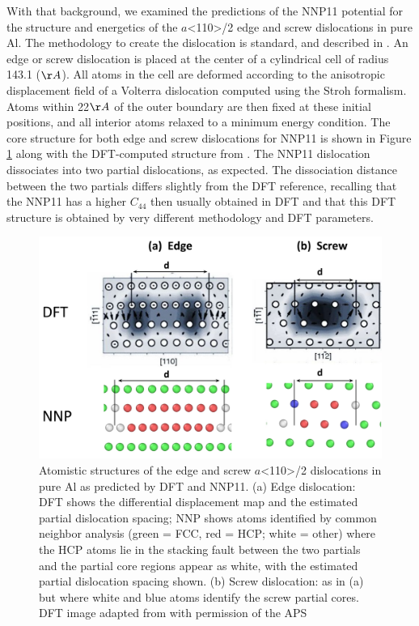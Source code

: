 \documentclass{article}
\begin{document}
With that background, we examined the predictions of the NNP11 potential for the structure and energetics of the $a$<110>/2 edge and screw dislocations in pure Al.
The methodology to create the dislocation is standard, and described in \cite{Hu2020AtomisticDynamics}.
An edge or screw dislocation is placed at the center of a cylindrical cell of radius 143.1 ($\AA$).
All atoms in the cell are deformed according to the anisotropic displacement field of a Volterra dislocation computed using the Stroh formalism\cite{Stroh1958DislocationsElasticity}.
Atoms within 22$\AA$ of the outer boundary are then fixed at these initial positions, and all interior atoms relaxed to a minimum energy condition.
The core structure for both edge and screw dislocations for NNP11 is shown in Figure \ref{fig:dislocation_NNPvsDFT} along with the DFT-computed structure from \cite{Woodward2008PredictionTheory}.
The NNP11 dislocation dissociates into two partial dislocations, as expected.
The dissociation distance between the two partials differs slightly from the DFT reference, recalling that the NNP11 has a higher $C_{44}$ then usually obtained in DFT and that this DFT structure is obtained by very different methodology and DFT parameters.

\begin{figure}[H]%
\centering%
\includegraphics[width=1\textwidth,center]{figures/dislocation_NNPvsDFT.png}%
\caption{Atomistic structures of the edge and screw $a$<110>/2 dislocations in pure Al as predicted by DFT and NNP11. (a) Edge dislocation: DFT shows the differential displacement map and the estimated partial dislocation spacing; NNP shows atoms identified by common neighbor analysis (green = FCC, red = HCP; white = other) where the HCP atoms lie in the stacking fault between the two partials and the partial core regions appear as white, with the estimated partial dislocation spacing shown. (b) Screw dislocation: as in (a) but where white and blue atoms identify the screw partial cores.
DFT image adapted from \cite{Woodward2008PredictionTheory} with permission of the APS
}%
\label{fig:dislocation_NNPvsDFT}
\end{figure}
\end{document}
